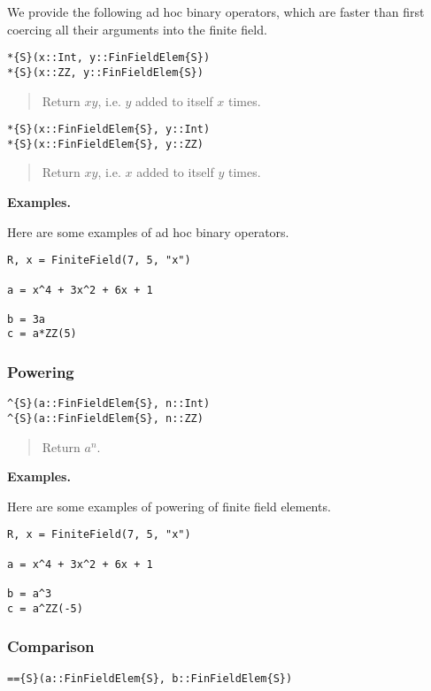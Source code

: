 \documentclass[a4paper,10pt]{article}
\newcommand{\desc}[1]{\vspace{-3mm}\begin{quote}#1\end{quote}}
\begin{document}
{{We provide the following ad hoc binary operators, which are faster than first
coercing all their arguments into the finite field.

\begin{lstlisting}
*{S}(x::Int, y::FinFieldElem{S})
*{S}(x::ZZ, y::FinFieldElem{S})
\end{lstlisting}

\desc{Return $xy$, i.e. $y$ added to itself $x$ times.}

\begin{lstlisting}
*{S}(x::FinFieldElem{S}, y::Int)
*{S}(x::FinFieldElem{S}, y::ZZ)
\end{lstlisting}

\desc{Return $xy$, i.e. $x$ added to itself $y$ times.}

\textbf{Examples.}

Here are some examples of ad hoc binary operators.

\begin{lstlisting}
R, x = FiniteField(7, 5, "x")

a = x^4 + 3x^2 + 6x + 1

b = 3a
c = a*ZZ(5)
\end{lstlisting}

\subsubsection{Powering}

\begin{lstlisting}
^{S}(a::FinFieldElem{S}, n::Int)
^{S}(a::FinFieldElem{S}, n::ZZ)
\end{lstlisting}

\desc{Return $a^n$.}

\textbf{Examples.}

Here are some examples of powering of finite field elements.

\begin{lstlisting}
R, x = FiniteField(7, 5, "x")

a = x^4 + 3x^2 + 6x + 1

b = a^3
c = a^ZZ(-5)
\end{lstlisting}

\subsubsection{Comparison}

\begin{lstlisting}
=={S}(a::FinFieldElem{S}, b::FinFieldElem{S})
\end{lstlisting}

}}
\end{document}
